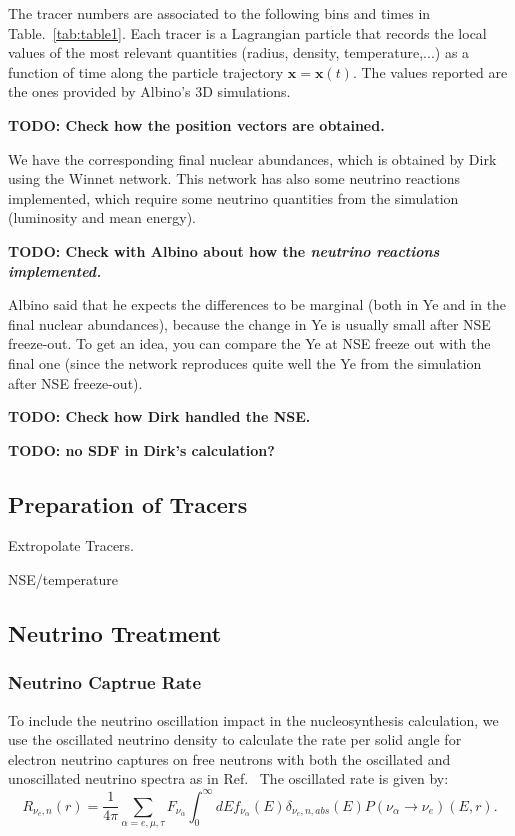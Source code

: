 \documentclass[
reprint,
preprintnumbers,
 amsmath,
 amssymb,
 aps,
onecolumn,
prd,
]{revtex4-2}
\begin{document}
The tracer numbers are associated to the following bins and times in Table.~\ref{tab:table1}.
Each tracer is a Lagrangian particle that records the local values of the most relevant quantities (radius, density, temperature,...) as a function of time along the particle trajectory $\mathbf{x}=\mathbf{x}(t).$
The values reported are the ones provided by Albino's 3D simulations.

\textbf{TODO: Check how the position vectors are obtained.}

We have the corresponding final nuclear abundances, which is obtained by Dirk using the Winnet network.
This network has also some neutrino reactions implemented, which require some neutrino quantities from the simulation (luminosity and mean energy).

\textbf{TODO: Check with Albino about how the \it{neutrino reactions implemented.}} 

Albino said that he expects the differences to be marginal (both in Ye and in the final nuclear abundances), because the change in Ye is usually small after NSE freeze-out.
To get an idea, you can compare the Ye at NSE freeze out with the final one (since the network reproduces quite well the Ye from the simulation after NSE freeze-out).

\textbf{TODO: Check how Dirk handled the NSE.} 

\textbf{TODO: no SDF in Dirk's calculation?}
\subsection{Preparation of Tracers}
Extropolate Tracers.

NSE/temperature
\subsection{Neutrino Treatment}

\subsubsection{Neutrino Captrue Rate}
To include the neutrino oscillation impact in the nucleosynthesis calculation, we use the oscillated neutrino density to calculate the rate per solid angle for electron neutrino captures on free neutrons with both the oscillated and unoscillated neutrino spectra as in Ref.~\cite{Frensel2017Neutri}
The oscillated rate is given by:
\begin{equation}
R_{\nu_e,n}(r) = \frac{1}{4\pi} \sum_{\alpha=e,\mu,\tau} F_{\nu_\alpha} \int_0^\infty dE f_{\nu_\alpha}(E) \delta_{\nu_e,n,abs}(E) P(\nu_\alpha \to \nu_e)(E,r).
\end{equation}
\end{document}

